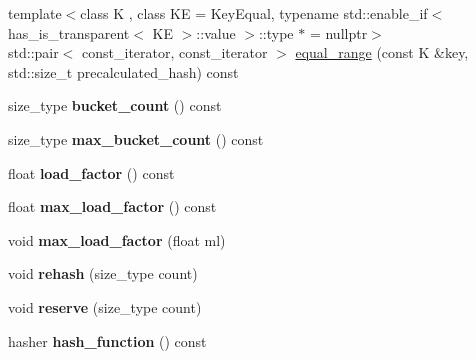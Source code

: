 \begin{DoxyCompactItemize}
\item 
{\footnotesize template$<$class K , class KE  = Key\+Equal, typename std\+::enable\+\_\+if$<$ has\+\_\+is\+\_\+transparent$<$ K\+E $>$\+::value $>$\+::type $\ast$  = nullptr$>$ }\\std\+::pair$<$ const\+\_\+iterator, const\+\_\+iterator $>$ \mbox{\hyperlink{classtsl_1_1ordered__map_a385534c97891dda963deb464945b71d1}{equal\+\_\+range}} (const K \&key, std\+::size\+\_\+t precalculated\+\_\+hash) const
\item 
\mbox{\label{classtsl_1_1ordered__map_aecbc9eb61fa66c9e6332bda2e436c9bb}} 
size\+\_\+type {\bfseries bucket\+\_\+count} () const
\item 
\mbox{\label{classtsl_1_1ordered__map_a88cc4ff4c7375a0addf84053c7ee0afe}} 
size\+\_\+type {\bfseries max\+\_\+bucket\+\_\+count} () const
\item 
\mbox{\label{classtsl_1_1ordered__map_a490d277f44174087c2c19e641b2c3a68}} 
float {\bfseries load\+\_\+factor} () const
\item 
\mbox{\label{classtsl_1_1ordered__map_a71e07f51d03bbe75d0f4ea35e535900d}} 
float {\bfseries max\+\_\+load\+\_\+factor} () const
\item 
\mbox{\label{classtsl_1_1ordered__map_abd6e8eb2b46a8d68d8daa0a982956cc2}} 
void {\bfseries max\+\_\+load\+\_\+factor} (float ml)
\item 
\mbox{\label{classtsl_1_1ordered__map_a50d0bd47263204cb68d8e843573e01a5}} 
void {\bfseries rehash} (size\+\_\+type count)
\item 
\mbox{\label{classtsl_1_1ordered__map_a7b42ce87034fb5ce42f49a5127053d4c}} 
void {\bfseries reserve} (size\+\_\+type count)
\item 
\mbox{\label{classtsl_1_1ordered__map_a2495ecd43d3bde3f4c9d64d6cbe3c1cb}} 
hasher {\bfseries hash\+\_\+function} () const
\item 
\mbox{\label{classtsl_1_1ordered__map_aef74f290cfd0c4ba12a74134b20e0345}} 

\end{DoxyCompactItemize}
